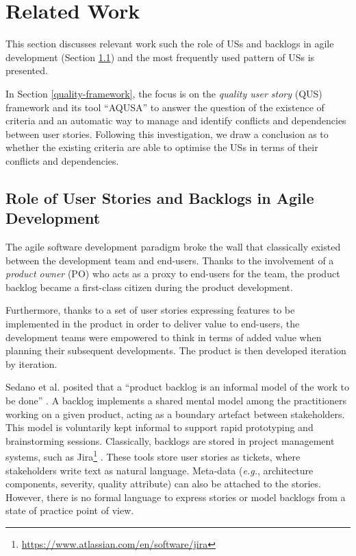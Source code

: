 \section{Related Work}\label{related-work}
This section discusses relevant work such the role of USs and backlogs in agile development (Section \ref{us}) and the most frequently used pattern of USs is presented. 

In Section \ref{quality-framework}, the focus is on the \emph{quality user story} (QUS) framework and its tool \enquote{AQUSA} to answer the question of the existence of criteria and an automatic way to manage and identify conflicts and dependencies between user stories. Following this investigation, we draw a conclusion as to whether the existing criteria are able to optimise the USs in terms of their conflicts and dependencies.

\subsection{Role of User Stories and Backlogs in Agile Development}\label{us}
The agile software development paradigm broke the wall that classically existed between the development team and end-users. Thanks to the involvement of a \emph{product owner} (PO) who acts as a proxy to end-users for the team, the product backlog \cite{sedano2019product} became a first-class citizen during the product development. 

Furthermore, thanks to a set of user stories expressing features to be implemented in the product in order to deliver value to end-users, the development teams were empowered to think in terms of added value when planning their subsequent developments. The product is then developed iteration by iteration. 

Sedano et al. posited that a \enquote{product backlog is an informal model of the work to be done} \cite{sedano2019product}. A backlog implements a shared mental model among the practitioners working on a given product, acting as a boundary artefact between stakeholders. This model is voluntarily kept informal to support rapid prototyping and brainstorming sessions. Classically, backlogs are stored in project management systems, such as Jira\footnote{\href{https://www.atlassian.com/en/software/jira}{https://www.atlassian.com/en/software/jira}} . These tools store user stories as tickets, where stakeholders write text as natural language. Meta-data (\emph{e.g.}, architecture components, severity, quality attribute) can also be attached to the stories. However, there is no formal language to express stories or model backlogs from a state of practice point of view.

